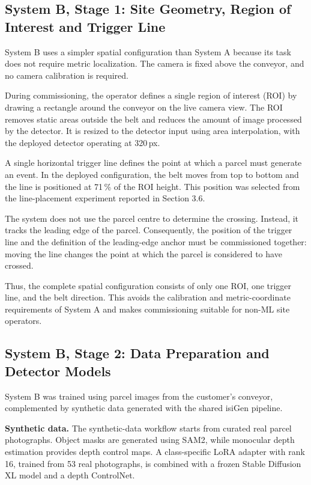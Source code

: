 \documentclass[9pt,a4paper,twocolumn]{rho-class/rho}
\begin{document}
\subsection{System B, Stage 1: Site Geometry, Region of Interest and Trigger Line}

System B uses a simpler spatial configuration than System A because its task does not require metric localization. The camera is fixed above the conveyor, and no camera calibration is required.

During commissioning, the operator defines a single region of interest (ROI) by drawing a rectangle around the conveyor on the live camera view. The ROI removes static areas outside the belt and reduces the amount of image processed by the detector. It is resized to the detector input using area interpolation, with the deployed detector operating at 320\,px.

A single horizontal trigger line defines the point at which a parcel must generate an event. In the deployed configuration, the belt moves from top to bottom and the line is positioned at 71\,\% of the ROI height. This position was selected from the line-placement experiment reported in Section 3.6.

The system does not use the parcel centre to determine the crossing. Instead, it tracks the leading edge of the parcel. Consequently, the position of the trigger line and the definition of the leading-edge anchor must be commissioned together: moving the line changes the point at which the parcel is considered to have crossed.

Thus, the complete spatial configuration consists of only one ROI, one trigger line, and the belt direction. This avoids the calibration and metric-coordinate requirements of System A and makes commissioning suitable for non-ML site operators.

\subsection{System B, Stage 2: Data Preparation and Detector Models}

System B was trained using parcel images from the customer's conveyor, complemented by synthetic data generated with the shared isiGen pipeline.

\textbf{Synthetic data.} The synthetic-data workflow starts from curated real parcel photographs. Object masks are generated using SAM2, while monocular depth estimation provides depth control maps. A class-specific LoRA adapter with rank 16, trained from 53 real photographs, is combined with a frozen Stable Diffusion XL model and a depth ControlNet.
\end{document}
